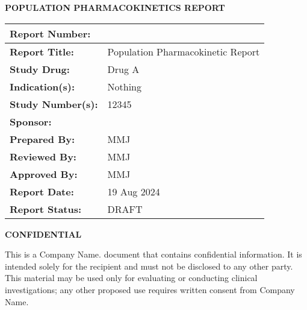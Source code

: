 \documentclass[
  letterpaper,
  toc=chapterentrywithdots,
  11pt,
  headings=small]{scrreprt}
\renewcommand*\contentsname{Table of contents}
\newcommand\contentsname{Table of contents}
\begin{document}
\thispagestyle{empty}
\vskip2cm
{\centerline{\textbf{POPULATION PHARMACOKINETICS REPORT}}}
\vskip1cm
\begin{table}[!h]
      \setlength{\tabcolsep}{5pt}
      \renewcommand{\arraystretch}{1.5}
      \begin{tabularx}{\textwidth}{|p{}|X|}
            \hline
            \textbf{Report Number:} & \\
            \hline
            \textbf{Report Title:} & Population Pharmacokinetic
Report \\
            \hline
            \textbf{Study Drug:} &  Drug A\\
            \hline
            \textbf{Indication(s):} & Nothing\\
            \hline
            \textbf{Study Number(s):} & 12345\\
            \hline
            \textbf{Sponsor:} & \\
            \hline
            \textbf{Prepared By:} & MMJ\\
            \hline
            \textbf{Reviewed By:} & MMJ \\
            \hline
            \textbf{Approved By:} & MMJ\\
            \hline
            \textbf{Report Date:} & 19 Aug 2024\\
            \hline
            \textbf{Report Status:}  & DRAFT\\
            \hline
      \end{tabularx}
\end{table}
\vskip0.5cm
\begin{center}
{\textbf{CONFIDENTIAL}}
\begin{mdframed}
    {\normalsize This is a Company Name. document that contains
confidential information. It is intended solely for the recipient and
must not be disclosed to any other party. This material may be used only
for evaluating or conducting clinical investigations; any other proposed
use requires written consent from Company Name.}
\end{mdframed}
\end{center}
\ifdefined\Shaded\renewenvironment{Shaded}{\begin{tcolorbox}[frame hidden, interior hidden, borderline west={3pt}{0pt}{shadecolor}, breakable, boxrule=0pt, enhanced, sharp corners]}{\end{tcolorbox}}\fi

\renewcommand*\contentsname{Contents}
{
\hypersetup{linkcolor=blue}
\setcounter{tocdepth}{2}
\tableofcontents
}
\listoffigures
\listoftables
{}
\end{document}
